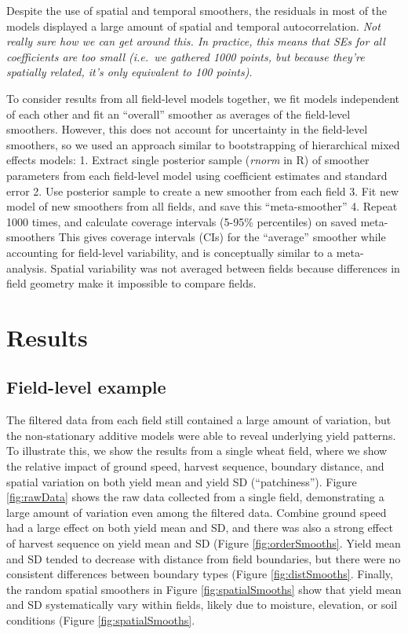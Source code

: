 \documentclass[]{elsarticle} %
\begin{document}
Despite the use of spatial and temporal smoothers, the residuals in most of the models displayed a large amount of spatial and temporal autocorrelation.
\emph{Not really sure how we can get around this. In practice, this means that SEs for all coefficients are too small (i.e.~we gathered 1000 points, but because they're spatially related, it's only equivalent to 100 points).}

To consider results from all field-level models together, we fit models independent of each other and fit an ``overall'' smoother as averages of the field-level smoothers.
However, this does not account for uncertainty in the field-level smoothers, so we used an approach similar to bootstrapping of hierarchical mixed effects models:
1. Extract single posterior sample (\emph{rnorm} in R) of smoother parameters from each field-level model using coefficient estimates and standard error
2. Use posterior sample to create a new smoother from each field
3. Fit new model of new smoothers from all fields, and save this ``meta-smoother''
4. Repeat 1000 times, and calculate coverage intervals (5-95\% percentiles) on saved meta-smoothers
This gives coverage intervals (CIs) for the ``average'' smoother while accounting for field-level variability, and is conceptually similar to a meta-analysis.
Spatial variability was not averaged between fields because differences in field geometry make it impossible to compare fields.

\hypertarget{results}{%
\section{Results}\label{results}}

\hypertarget{field-level-example}{%
\subsection{Field-level example}\label{field-level-example}}

The filtered data from each field still contained a large amount of variation, but the non-stationary additive models were able to reveal underlying yield patterns.
To illustrate this, we show the results from a single wheat field, where we show the relative impact of ground speed, harvest sequence, boundary distance, and spatial variation on both yield mean and yield SD (``patchiness'').
Figure \ref{fig:rawData} shows the raw data collected from a single field, demonstrating a large amount of variation even among the filtered data.
Combine ground speed had a large effect on both yield mean and SD, and there was also a strong effect of harvest sequence on yield mean and SD (Figure \ref{fig:orderSmooths}.
Yield mean and SD tended to decrease with distance from field boundaries, but there were no consistent differences between boundary types (Figure \ref{fig:distSmooths}.
Finally, the random spatial smoothers in Figure \ref{fig:spatialSmooths} show that yield mean and SD systematically vary within fields, likely due to moisture, elevation, or soil conditions (Figure \ref{fig:spatialSmooths}.
\end{document}
